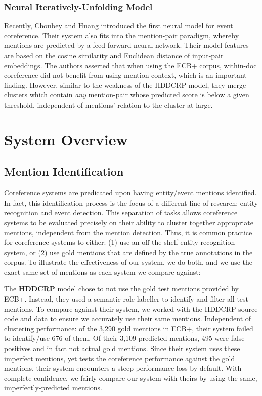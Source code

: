 \documentclass[11pt,a4paper]{article}
\begin{document}
\subsubsection{Neural Iteratively-Unfolding Model}
\label{sec:Choubey}
Recently, Choubey and Huang  introduced the first neural model for event coreference.  Their system also fits into the mention-pair paradigm, whereby mentions are predicted by a feed-forward neural network. Their model features are based on the cosine similarity and Euclidean distance of input-pair embeddings.  The authors asserted that when using the ECB+ corpus, within-doc coreference did not benefit from using mention context, which is an important finding.  However, similar to the weakness of the HDDCRP model, they merge clusters which contain \textit{any} mention-pair whose predicted score is below a given threshold, independent of mentions' relation to the cluster at large.


\section{System Overview}
\subsection{Mention Identification}
\label{sec:mentionid}
Coreference systems are predicated upon having entity/event mentions identified.  In fact, this identification process is the focus of a different line of research: entity recognition and event detection.  This separation of tasks allows coreference systems to be evaluated precisely on their ability to cluster together appropriate mentions, independent from the mention detection.  Thus, it is common practice for coreference systems to either: (1) use an off-the-shelf entity recognition system, or (2) use gold mentions that are defined by the true annotations in the corpus.  To illustrate the effectiveness of our system, we do both, and we use the exact same set of mentions as each system we compare against:


The \textbf{HDDCRP} model chose to not use the gold test mentions provided by ECB+.  Instead, they used a semantic role labeller to identify and filter all test mentions.
To compare against their system, we worked with the HDDCRP source code and data to ensure we accurately use their same mentions.  Independent of clustering performance: of the 3,290 gold mentions in ECB+, their system failed to identify/use 676 of them.  Of their 3,109 predicted mentions, 495 were false positives and in fact not actual gold mentions.  Since their system uses these imperfect mentions, yet tests the coreference performance against the gold mentions, their system encounters a steep performance loss by default.  With complete confidence, we fairly compare our system with theirs by using the same, imperfectly-predicted mentions.
\end{document}
